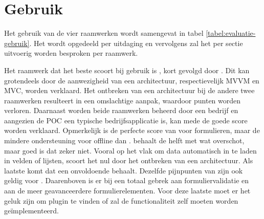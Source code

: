 \section{Gebruik}
\label{sec:evaluatie-gebruik}
Het gebruik van de vier raamwerken wordt samengevat in tabel \ref{tabel:evaluatie-gebruik}.
Het wordt opgedeeld per uitdaging en vervolgens zal het per sectie uitvoerig worden besproken per raamwerk.

\begin{table}[H]
\centering
{}
\caption{Overzicht van gebruik voor \st{}~(\sta), \kendo{}~(\kendoa), \jqm{}~(\jqma) en \lungo{}~(\lungoa).}
\label{tabel:evaluatie-gebruik}
\end{table}

Het raamwerk dat het beste scoort bij gebruik is \kendo{}, kort gevolgd door \st{}.
Dit kan grotendeels door de aanwezigheid van een architectuur, respectievelijk MVVM en MVC, worden verklaard.
Het ontbreken van een architectuur bij de andere twee raamwerken resulteert in een omslachtige aanpak, waardoor punten worden verloren.
Daarnaast worden beide raamwerken beheerd door een bedrijf en aangezien de POC een typische bedrijfsapplicatie is, kan mede de goede score worden verklaard.
Opmerkelijk is de perfecte score van \kendo{} voor formulieren, maar de mindere ondersteuning voor offline dan \st{}.
\jqm{} behaalt de helft met wat overschot, maar goed is dat zeker niet.
Vooral op het vlak om data automatisch in te laden in velden of lijsten, scoort het nul door het ontbreken van een architectuur. 
Als laatste komt \lungo{} dat een onvoldoende behaalt.
Dezelfde pijnpunten van \jqm{} zijn ook geldig voor \lungo{}.
Daarenboven is er bij \lungo{} een totaal gebrek aan formuliervalidatie en aan de meer geavanceerdere formulierelementen.
Voor deze laatste moet er het geluk zijn om plugin te vinden of zal de functionaliteit zelf moeten worden geïmplementeerd. 

